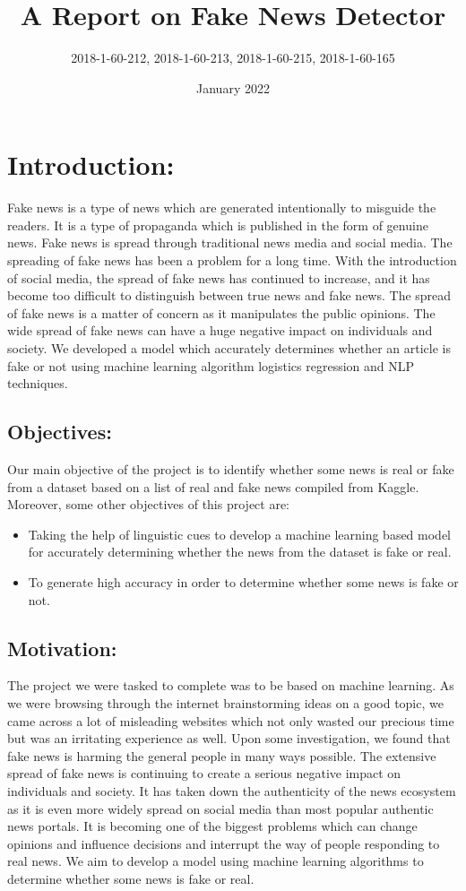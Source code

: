 \documentclass{article}
\title{A Report on Fake News Detector}
\author{2018-1-60-212, 2018-1-60-213, 2018-1-60-215, 2018-1-60-165}
\date{January 2022}
\begin{document}
\maketitle

\section{Introduction:}
  Fake news is a type of news which are generated intentionally to misguide the readers. It is a type of propaganda which is published in the form of genuine news. Fake news is spread through traditional news media and social media. The spreading of fake news has been a problem for a long time. With the introduction of social media, the spread of fake news has continued to increase, and it has become too difficult to distinguish between true news and fake news. The spread of fake news is a matter of concern as it manipulates the public opinions. The wide spread of fake news can have a huge negative impact on individuals and society. We developed a model which accurately determines whether an article is fake or not using machine learning algorithm logistics regression and NLP techniques.
   
\subsection{Objectives:}
    Our main objective of the project is to identify whether some news is real or fake from a dataset based on a list of real and fake news compiled from Kaggle. Moreover, some other objectives of this project are:
    \begin{itemize}
    \item	Taking the help of linguistic cues to develop a machine learning based model for accurately determining whether the news from the dataset is fake or real.
    \item To generate high accuracy in order to determine whether some news is fake or not.
\end{itemize}
   


   \subsection{Motivation:}
   The project we were tasked to complete was to be based on machine learning. As we were browsing through the internet brainstorming ideas on a good topic, we came across a lot of misleading websites which not only wasted our precious time but was an irritating experience as well. Upon some investigation, we found that fake news is harming the general people in many ways possible. The extensive spread of fake news is continuing to create a serious negative impact on individuals and society. It has taken down the authenticity of the news ecosystem as it is even more widely spread on social media than most popular authentic news portals. It is becoming one of the biggest problems which can change opinions and influence decisions and interrupt the way of people responding to real news. We aim to develop a model using machine learning algorithms to determine whether some news is fake or real.
   
\end{document}
